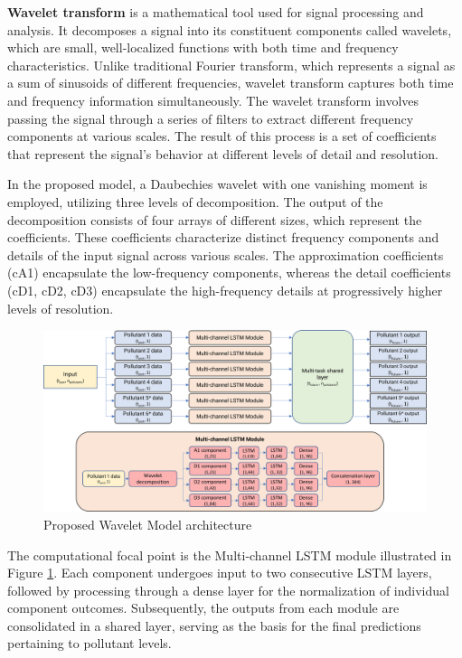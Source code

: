 \textbf{Wavelet transform} is a mathematical tool used for signal processing and analysis. It decomposes a signal into its constituent components called wavelets, which are small, well-localized functions with both time and frequency characteristics. Unlike traditional Fourier transform, which represents a signal as a sum of sinusoids of different frequencies, wavelet transform captures both time and frequency information simultaneously.
The wavelet transform involves passing the signal through a series of filters to extract different frequency components at various scales. The result of this process is a set of coefficients that represent the signal's behavior at different levels of detail and resolution.

In the proposed model, a Daubechies wavelet with one vanishing moment is employed, utilizing three levels of decomposition. The output of the decomposition consists of four arrays of different sizes, which represent the coefficients. These coefficients characterize distinct frequency components and details of the input signal across various scales. The approximation coefficients (cA1) encapsulate the low-frequency components, whereas the detail coefficients (cD1, cD2, cD3) encapsulate the high-frequency details at progressively higher levels of resolution. 


\begin{figure}
    \centering
    \includegraphics[width=1\linewidth]{images/model architectures/waveletmodel.png}
    \caption{Proposed Wavelet Model architecture}
    \label{fig:waveletmodel}
\end{figure}

The computational focal point is the Multi-channel LSTM module illustrated in Figure \ref{fig:waveletmodel}. Each component undergoes input to two consecutive LSTM layers, followed by processing through a dense layer for the normalization of individual component outcomes. Subsequently, the outputs from each module are consolidated in a shared layer, serving as the basis for the final predictions pertaining to pollutant levels.

